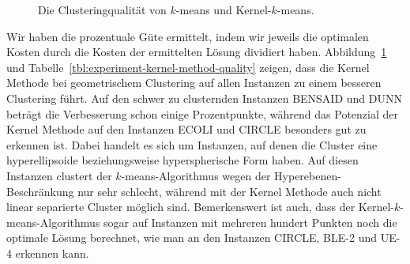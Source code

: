 \begin{figure}[h!]
	\centering
\caption{Die Clusteringqualität von $k$-means und Kernel-$k$-means.}
\label{fig:experiment-kernel-method-quality}
\end{figure}
Wir haben die prozentuale Güte ermittelt, indem wir jeweils die optimalen Kosten durch die Kosten der ermittelten Lösung
dividiert haben.
Abbildung~\ref{fig:experiment-kernel-method-quality} und Tabelle~\ref{tbl:experiment-kernel-method-quality} zeigen, dass
die Kernel Methode bei geometrischem Clustering auf allen Instanzen zu einem besseren Clustering führt. Auf den schwer zu
clusternden Instanzen BENSAID und DUNN beträgt die Verbesserung schon einige Prozentpunkte, während das Potenzial der Kernel
Methode auf den Instanzen ECOLI und CIRCLE besonders gut zu erkennen ist. Dabei handelt es sich um Instanzen, auf denen die Cluster
eine hyperellipsoide beziehungsweise hyperspherische Form haben. Auf diesen Instanzen clustert der $k$-means-Algorithmus wegen der
Hyperebenen-Beschränkung nur sehr schlecht, während mit der Kernel Methode auch nicht linear separierte Cluster möglich sind.
Bemerkenswert ist auch, dass der Kernel-$k$-means-Algorithmus sogar auf Instanzen mit mehreren hundert Punkten noch die optimale
Lösung berechnet, wie man an den Instanzen CIRCLE, BLE-2 und UE-4 erkennen kann.
